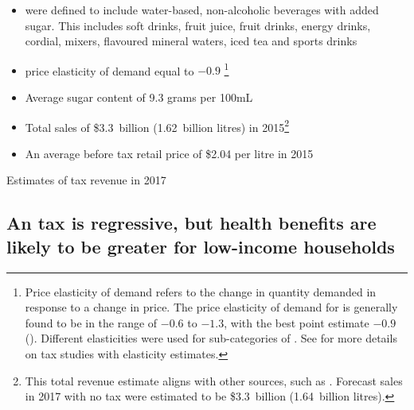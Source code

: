 \documentclass[embargoed]{grattan}
\begin{document}
\begin{itemize}
\item
  \SSBs{} were defined to include water-based, non-alcoholic beverages with added sugar.
This includes soft drinks, fruit juice, fruit drinks, energy drinks, cordial, mixers, flavoured mineral waters, iced tea and sports drinks
\item
  \SSB{} price elasticity of demand equal to \(-0.9\)%
\footnote{Price elasticity of demand refers to the change in quantity demanded in response to a change in price.
The price elasticity of demand for \SSBs{} is generally found to be in the range of \(-0.6\) to \(-1.3\), with the best point estimate \(-0.9\) (\textcites{Andreyeva2010impactfoodprices}{Block2010Pointpurchaseprice}{Sharma2014effectstaxingsugarsweetened}{Yang2016child}{Lineffectssugarsweetened}{Powell2013Assessingpotentialeffectiveness}{Bahl2003uneasycasediscriminatory}{Miao2013Accountingproductsubstitution}{Escobar2013Evidencethattax}).
Different elasticities were used for sub-categories of \SSBs{}.
See  for more details on \SSB{} tax studies with elasticity estimates.}
\item
  Average sugar content of 9.3 grams per 100mL
\item
  Total \SSB{} sales of \$3.3~billion (1.62~billion litres) in 2015\footnote{This total revenue estimate aligns with other sources, such as \textcite{Levy2014QuenchingAustraliasthirst}.
Forecast sales in 2017 with no tax were estimated to be \$3.3~billion (1.64~billion litres).}
\item
  An average \SSB{} before tax retail price of \$2.04 per litre in 2015
\end{itemize}

\begin{table}
\caption{Estimates of \SSB{} tax revenue in 2017}\label{tbl:Estimates-of-SSB-tax-revenue-2017}




\end{table}

\subsection{An \SSB{} tax is regressive, but health benefits are likely to be greater for low-income households}\label{an-ssb-tax-is-regressive-but-health-benefits-are-likely-to-be-greater-for-low-income-households}
\end{document}
